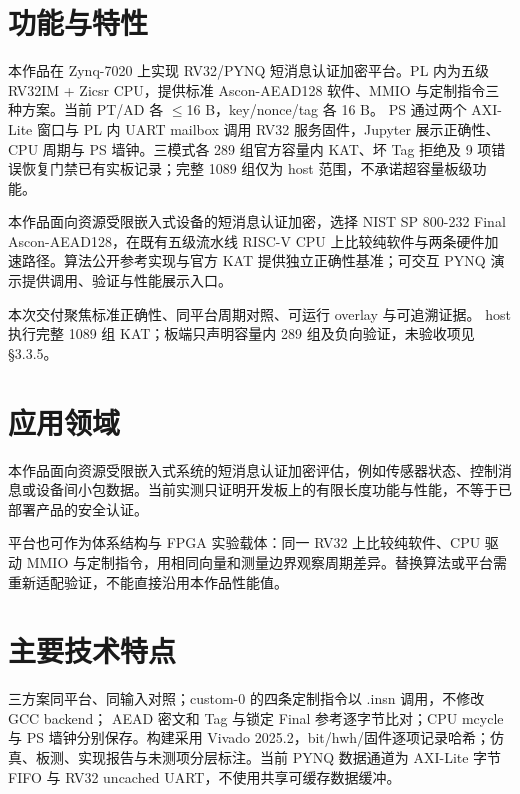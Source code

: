 
\Needspace{85pt}

\section{功能与特性}

本作品在 Zynq-7020 上实现 RV32/PYNQ 短消息认证加密平台。PL 内为五级 RV32IM + Zicsr CPU，提供标准 Ascon-AEAD128 软件、MMIO 与定制指令三种方案。当前 PT/AD 各 $\leq$16 B，key/nonce/tag 各 16 B。 PS 通过两个 AXI-Lite 窗口与 PL 内 UART mailbox 调用 RV32 服务固件，Jupyter 展示正确性、CPU 周期与 PS 墙钟。三模式各 289 组官方容量内 KAT、坏 Tag 拒绝及 9 项错误恢复门禁已有实板记录；完整 1089 组仅为 host 范围，不承诺超容量板级功能。

本作品面向资源受限嵌入式设备的短消息认证加密，选择 NIST SP 800-232 Final Ascon-AEAD128，在既有五级流水线 RISC-V CPU 上比较纯软件与两条硬件加速路径。算法公开参考实现与官方 KAT 提供独立正确性基准；可交互 PYNQ 演示提供调用、验证与性能展示入口。

本次交付聚焦标准正确性、同平台周期对照、可运行 overlay 与可追溯证据。 host 执行完整 1089 组 KAT；板端只声明容量内 289 组及负向验证，未验收项见 §3.3.5。

\Needspace{85pt}

\section{应用领域}

本作品面向资源受限嵌入式系统的短消息认证加密评估，例如传感器状态、控制消息或设备间小包数据。当前实测只证明开发板上的有限长度功能与性能，不等于已部署产品的安全认证。

平台也可作为体系结构与 FPGA 实验载体：同一 RV32 上比较纯软件、CPU 驱动 MMIO 与定制指令，用相同向量和测量边界观察周期差异。替换算法或平台需重新适配验证，不能直接沿用本作品性能值。

\Needspace{85pt}

\section{主要技术特点}

三方案同平台、同输入对照；custom-0 的四条定制指令以 .insn 调用，不修改 GCC backend； AEAD 密文和 Tag 与锁定 Final 参考逐字节比对；CPU mcycle 与 PS 墙钟分别保存。构建采用 Vivado 2025.2，bit/hwh/固件逐项记录哈希；仿真、板测、实现报告与未测项分层标注。当前 PYNQ 数据通道为 AXI-Lite 字节 FIFO 与 RV32 uncached UART，不使用共享可缓存数据缓冲。

